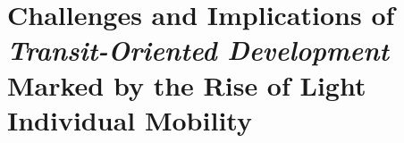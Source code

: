 
\chapter
{Challenges and Implications of \textsl{Transit-Oriented Development} Marked by the Rise of Light Individual Mobility
    \label{chap1:titre}
    }
    \begin{refsegment}



\end{refsegment}
